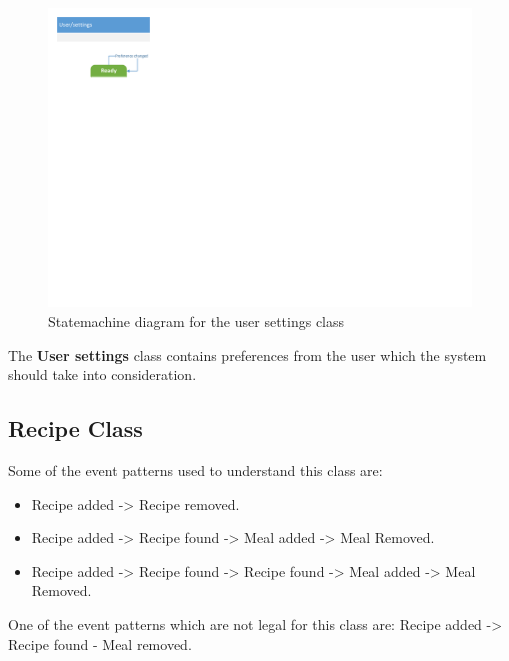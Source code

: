 \begin{figure}[H]
	\centering
	\includegraphics[clip=true, trim=0.5cm 15.5cm 22.5cm 0.5cm]{Development/ProblemDomain/UserSettingsClass.pdf}
	\caption{Statemachine diagram for the user settings class} \label{UserSettingsClass}
\end{figure}
The \textbf{User settings} class contains preferences from the user which the system should take into consideration.

\subsection{Recipe Class}
Some of the event patterns used to understand this class are:
\begin{itemize}
	\item Recipe added -> Recipe removed.
	\item Recipe added -> Recipe found -> Meal added -> Meal Removed.
	\item Recipe added -> Recipe found -> Recipe found -> Meal added -> Meal Removed.
\end{itemize}

One of the event patterns which are not legal for this class are: Recipe added -> Recipe found - Meal removed.

